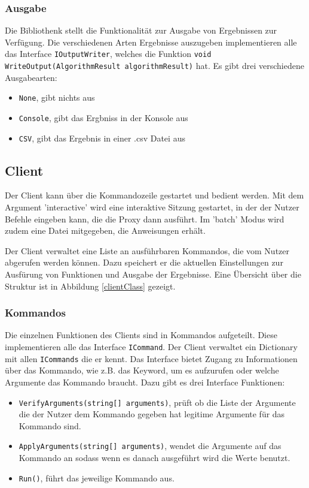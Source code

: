 \subsubsection{Ausgabe}

Die Bibliothenk stellt die Funktionalität zur Ausgabe von Ergebnissen zur Verfügung. Die verschiedenen Arten Ergebnisse auszugeben implementieren alle
das Interface \verb|IOutputWriter|, welches die Funktion \verb|void WriteOutput(AlgorithmResult algorithmResult)| hat. Es gibt drei verschiedene Ausgabearten:

\begin{itemize}
  \item \verb|None|, gibt nichts aus
  \item \verb|Console|, gibt das Ergbniss in der Konsole aus
  \item \verb|CSV|, gibt das Ergebnis in einer .csv Datei aus
\end{itemize}


\subsection{Client}

Der Client kann über die Kommandozeile gestartet und bedient werden. Mit dem Argument 'interactive' wird eine interaktive Sitzung gestartet,
in der der Nutzer Befehle eingeben kann, die die Proxy dann ausführt. Im 'batch' Modus wird zudem eine Datei mitgegeben, die Anweisungen erhält.

Der Client verwaltet eine Liste an ausführbaren Kommandos, die vom Nutzer abgerufen werden können. Dazu speichert er die aktuellen Einstellungen zur Ausfürung von Funktionen und Ausgabe der Ergebnisse. Eine Übersicht über die Struktur ist in Abbildung \ref{clientClass} gezeigt.



\subsubsection{Kommandos}

Die einzelnen Funktionen des Clients sind in Kommandos aufgeteilt.
Diese implementieren alle das Interface \verb|ICommand|. Der Client verwaltet ein Dictionary mit allen \verb|ICommands| die er kennt.
Das Interface bietet Zugang zu Informationen über das Kommando, wie z.B. das Keyword, um es aufzurufen oder welche Argumente das Kommando braucht.
Dazu gibt es drei Interface Funktionen:

\begin{itemize}
  \item \verb|VerifyArguments(string[] arguments)|, prüft ob die Liste der Argumente die der Nutzer dem Kommando gegeben hat legitime Argumente für das Kommando sind.
  \item \verb|ApplyArguments(string[] arguments)|, wendet die Argumente auf das Kommando an sodass wenn es danach ausgeführt wird die Werte benutzt.
  \item \verb|Run()|, führt das jeweilige Kommando aus.
\end{itemize}


